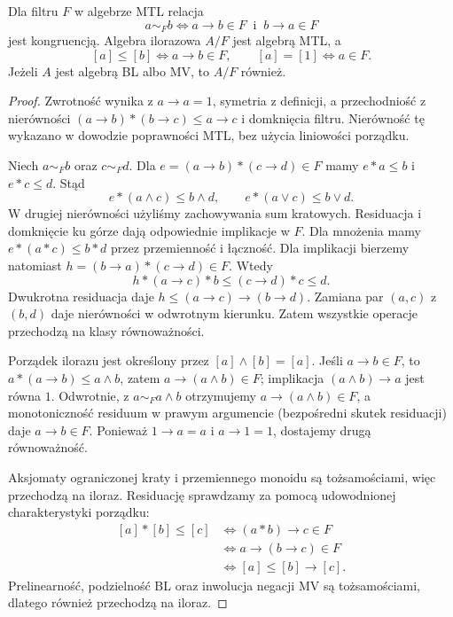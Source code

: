 \begin{twierdzenie}\label{thm:lst-fuzzy-filter-quotient}
Dla filtru $F$ w algebrze MTL relacja
\[
 a\sim_F b\iff a\to b\in F\ \text{ i }\ b\to a\in F
\]
jest kongruencją. Algebra ilorazowa $A/F$ jest algebrą MTL, a
\[
 [a]\leq[b]\iff a\to b\in F,\qquad
 [a]=[1]\iff a\in F.
\]
Jeżeli $A$ jest algebrą BL albo MV, to $A/F$ również.
\end{twierdzenie}
\begin{proof}
Zwrotność wynika z $a\to a=1$, symetria z definicji, a przechodniość
z nierówności
$(a\to b)*(b\to c)\leq a\to c$ i domknięcia filtru.
Nierówność tę wykazano w dowodzie poprawności MTL, bez użycia
liniowości porządku.

Niech $a\sim_F b$ oraz $c\sim_F d$. Dla
$e=(a\to b)*(c\to d)\in F$ mamy $e*a\leq b$ i $e*c\leq d$.
Stąd
\[
 e*(a\wedge c)\leq b\wedge d,\qquad
 e*(a\vee c)\leq b\vee d.
\]
W drugiej nierówności użyliśmy zachowywania sum kratowych.
Residuacja i domknięcie ku górze dają odpowiednie implikacje
w $F$. Dla mnożenia mamy
$e*(a*c)\leq b*d$ przez przemienność i łączność.
Dla implikacji bierzemy natomiast
$h=(b\to a)*(c\to d)\in F$. Wtedy
\[
 h*(a\to c)*b\leq(c\to d)*c\leq d.
\]
Dwukrotna residuacja daje
$h\leq(a\to c)\to(b\to d)$. Zamiana par $(a,c)$ z $(b,d)$
daje nierówności w odwrotnym kierunku. Zatem wszystkie operacje
przechodzą na klasy równoważności.

Porządek ilorazu jest określony przez $[a]\wedge[b]=[a]$.
Jeśli $a\to b\in F$, to $a*(a\to b)\leq a\wedge b$, zatem
$a\to(a\wedge b)\in F$; implikacja $(a\wedge b)\to a$
jest równa $1$. Odwrotnie, z $a\sim_F a\wedge b$ otrzymujemy
$a\to(a\wedge b)\in F$, a monotoniczność residuum w prawym
argumencie (bezpośredni skutek residuacji) daje $a\to b\in F$.
Ponieważ $1\to a=a$ i $a\to1=1$, dostajemy drugą równoważność.

Aksjomaty ograniczonej kraty i przemiennego monoidu są
tożsamościami, więc przechodzą na iloraz. Residuację sprawdzamy
za pomocą udowodnionej charakterystyki porządku:
\[
\begin{split}
 [a]*[b]\leq[c]
 &\iff (a*b)\to c\in F\\
 &\iff a\to(b\to c)\in F\\
 &\iff [a]\leq[b]\to[c].
\end{split}
\]
Prelinearność, podzielność BL oraz inwolucja negacji MV są
tożsamościami, dlatego również przechodzą na iloraz.
\end{proof}

